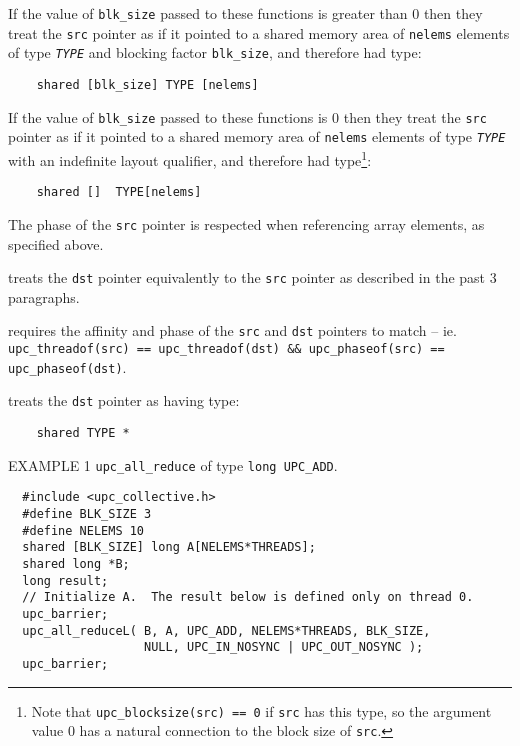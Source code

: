 \np {}

\np
If the value of {\tt blk\_size} passed to these functions is
greater than 0 then they treat the {\tt src} pointer
as if it pointed to a shared memory area of {\tt nelems} elements of
type {\tt{\em TYPE}} and blocking factor {\tt blk\_size}, and therefore
had type:

\begin{verbatim}
    shared [blk_size] TYPE [nelems]
\end{verbatim}

\np
If the value of {\tt blk\_size} passed to these functions is
0 then they treat the {\tt src} pointer
as if it pointed to a shared memory area of {\tt nelems} elements of
type {\tt{\em TYPE}} with an indefinite layout qualifier, and
therefore had
type\footnote{Note that {\tt upc\_blocksize(src) == 0} if
{\tt src} has this type, so the argument value 0 has a natural
connection to the block size of {\tt src}.}:

\begin{verbatim}
    shared []  TYPE[nelems]
\end{verbatim}

\np The phase of the {\tt src} pointer is respected when
referencing array elements, as specified above.

 treats the {\tt dst} pointer
    equivalently to the {\tt src} pointer as described in the past 3
    paragraphs.
    
 requires the affinity and
phase of the {\tt src} and {\tt dst} pointers to match -- ie. 
{\tt upc\_threadof(src) == upc\_threadof(dst) \&\& upc\_phaseof(src) == upc\_phaseof(dst)}.

 treats the {\tt dst} pointer as having type:

\begin{verbatim}
    shared TYPE *
\end{verbatim}


\np EXAMPLE 1 {\tt upc\_all\_reduce} of type {\tt long UPC\_ADD}.
\begin{verbatim}
  #include <upc_collective.h>
  #define BLK_SIZE 3
  #define NELEMS 10
  shared [BLK_SIZE] long A[NELEMS*THREADS];
  shared long *B;
  long result;
  // Initialize A.  The result below is defined only on thread 0.
  upc_barrier;
  upc_all_reduceL( B, A, UPC_ADD, NELEMS*THREADS, BLK_SIZE,
                   NULL, UPC_IN_NOSYNC | UPC_OUT_NOSYNC );
  upc_barrier;
\end{verbatim}

